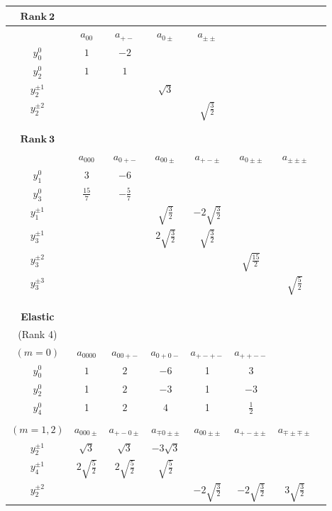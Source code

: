 \documentclass[10pt,a4paper]{article}
\begin{document}
\begin{figure}

\begin{tabular}{c|ccccccc}
$\mathbf{Rank\ 2}$ \\
\hline
& $a_{00}$ & $a_{+-}$ & $a_{0\pm}$ & $a_{\pm\pm}$ \\
$y_0^0$  & $1$ & $-2$ \\
$y_2^0$  & $1$ & $1$ \\
$y_2^{\pm 1}$  &  & & $\sqrt{3}$ \\
$y_2^{\pm 2}$  &  & & & $\sqrt{\frac{3}{2}}$
\\
\\
\\
$\mathbf{Rank\ 3}$\\
\hline
 & $a_{000}$ & $a_{0+-}$ & $a_{00\pm}$ & $a_{+-\pm}$  & $a_{0\pm\pm}$ & $a_{\pm\pm\pm}$ \\
$y_1^0$  & $3$ & $-6$ \\
$y_3^0$  & $\frac{15}{7}$ & $-\frac{5}{7}$ \\
$y_1^{\pm 1}$  &  & & $\sqrt{\frac{3}{2}}$ & $-2\sqrt{\frac{3}{2}}$\\
$y_3^{\pm 1}$  &  & & $2\sqrt{\frac{3}{2}}$ & $\sqrt{\frac{3}{2}}$\\
$y_3^{\pm 2}$  &  & & & & $\sqrt{\frac{15}{2}}$\\
$y_3^{\pm 3}$  &  & & & & & $\sqrt{\frac{5}{2}}$\\
\\
\\
\\
\textbf{Elastic}\\
(Rank 4) \\
 \hline 
$(m=0)$& $a_{0000}$ & $a_{00+-}$ & $a_{0+0-}$ & $a_{+-+-}$  & $a_{++--}$ \\
$y_0^{0}$  & $1$ & $2$ &$-6$ & 1 & 3 \\
$y_2^0$  & 1 & $2$ & $-3$ & 1 & $-3$\\
$y_4^0$ & 1 & $2$ & $4$ & 1 & $\frac{1}{2}$\\
 \\
$(m=1,2)$& $a_{000\pm}$ & $a_{+- 0 \pm}$  & $a_{\mp 0 \pm\pm}$ & $a_{00\pm\pm}$ & $a_{+- \pm \pm}$  & $a_{\mp \pm \mp\pm}$ \\
$y_2^{\pm 1}$  & $\sqrt{3}$ & $\sqrt{3}$ &  $-3\sqrt{3}$\\
$y_4^{\pm 1}$  & $2\sqrt{\frac{5}{2}}$ & $2\sqrt{\frac{5}{2}}$ & $\sqrt{\frac{5}{2}}$  \\
$y_2^{\pm 2}$  & & & & $-2\sqrt{\frac{3}{2}}$ & $-2\sqrt{\frac{3}{2}}$ & $3\sqrt{\frac{3}{2}}$  \\

\end{tabular}
\end{figure}
\end{document}
